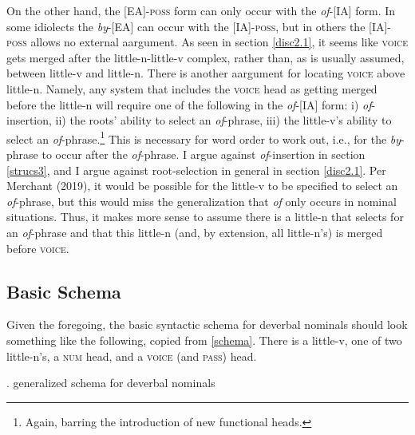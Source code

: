 \documentclass[12pt]{article}
\newcommand*{\textsub}[1]{\ensuremath{_\textrm{{\scriptsize #1}}}}
\begin{document}
On the other hand, the [EA]-\textsc{poss} form can only occur with the \textit{of}-[IA] form. In some idiolects the \textit{by}-[EA] can occur with the [IA]-\textsc{poss}, but in others the [IA]-\textsc{poss} allows no external aargument. As seen in section \ref{disc2.1}, it seems like \textsc{voice} gets merged after the little-n-little-v complex, rather than, as is usually assumed, between little-v and little-n. There is another aargument for locating \textsc{voice} above little-n. Namely, any system that includes the \textsc{voice} head as getting merged before the little-n will require one of the following in the \textit{of}-[IA] form: i) \textit{of}-insertion, ii) the roots' ability to select an \textit{of}-phrase, iii) the little-v's ability to select an \textit{of}-phrase.\footnote{ Again, barring the introduction of new functional heads.} This is necessary for word order to work out, i.e., for the \textit{by}-phrase to occur after the \textit{of}-phrase. I argue against \textit{of}-insertion in section \ref{strucs3}, and I argue against root-selection in general in section \ref{disc2.1}. Per Merchant (2019), it would be possible for the little-v to be specified to select an \textit{of}-phrase, but this would miss the generalization that \textit{of} only occurs in nominal situations. Thus, it makes more sense to assume there is a little-n that selects for an \textit{of}-phrase and that this little-n (and, by extension, all little-n's) is merged before \textsc{voice}.

\subsection{Basic Schema}\label{disc4}

Given the foregoing, the basic syntactic schema for deverbal nominals should look something like the following, copied from \ref{schema}. There is a little-v, one of two little-n's, a \textsc{num} head, and a \textsc{voice} (and \textsc{pass}) head.

\singlespacing

\singlespacing

\ex. \label{schema2} generalized schema for deverbal nominals

\vspace*{-10pt}
\par \hfill \par
\doublespacing
\end{document}
